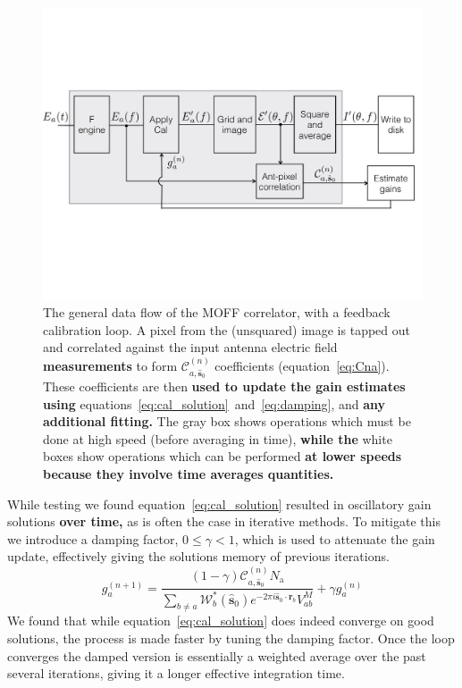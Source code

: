 \documentclass[a4paper,fleqn,usenatbib]{../mnras}
\newcommand{\Nant}{\ensuremath{N_{\mathrm{a}}}}
\newcommand{\spix}{\ensuremath{\hat{\mathbf{s}}_{0}}}
\newcommand{\Cna}[1][n]{\ensuremath{\mathcal{C}^{(#1)}_{a,\spix}}}
\newcommand{\rb}{\ensuremath{\mathbf{r}_b}}
\newcommand{\damp}{\ensuremath{\gamma}}
\begin{document}
\begin{figure}
\begin{center}
\includegraphics[width=\columnwidth]{fig2.pdf}
\caption{The general data flow of the MOFF correlator, with a feedback calibration loop. A pixel 
from the (unsquared) image is tapped out and correlated against the input antenna electric field 
\textbf{measurements} to form $\Cna$ coefficients (equation~\ref{eq:Cna}). These coefficients are then 
\textbf{used to update the gain estimates using} equations~\ref{eq:cal_solution}~and~\ref{eq:damping},
and \textbf{any additional fitting.}
The gray box shows operations which must be done at high speed (before averaging in time),
\textbf{while the} white boxes show operations which can be performed \textbf{at lower speeds because
they involve time averages quantities.}
}
\label{fig:schematic}
\end{center}
\end{figure}

While testing we found equation~\ref{eq:cal_solution} resulted in oscillatory gain solutions \textbf{over time,} 
as is often the case in iterative methods. To mitigate this we 
introduce a damping factor, $0 \leq \damp <1$, which is used to attenuate the gain update, 
effectively giving the solutions memory of previous iterations.
\begin{equation}\label{eq:damping}
g^{(n+1)}_a = \frac{(1-\damp)\Cna \Nant }{ \sum_{b\ne a} \mathcal{W}^*_b(\spix) e^{-2\pi i \spix \cdot \rb} V^M_{ab} }+ \damp g^{(n)}_a
\end{equation}
We found that while equation~\ref{eq:cal_solution} does indeed converge on good solutions, 
the process is made faster by tuning the damping factor. 
 Once the loop converges the damped version is 
essentially a weighted average over the past several iterations, giving it a longer effective 
integration time. 
\end{document}
